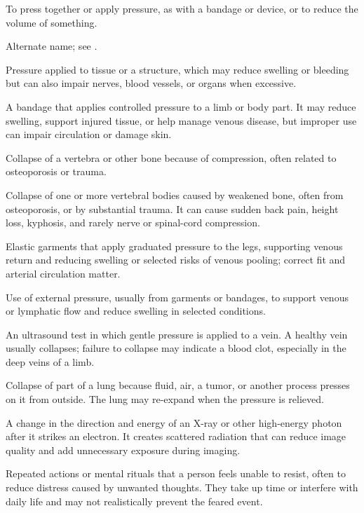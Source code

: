  To press together or apply pressure, as with a bandage or device, or to reduce the volume of something.

 Alternate name; see .

 Pressure applied to tissue or a structure, which may reduce swelling or bleeding but can also impair nerves, blood vessels, or organs when excessive.

 A bandage that applies controlled pressure to a limb or body part. It may reduce swelling, support injured tissue, or help manage venous disease, but improper use can impair circulation or damage skin.

 Collapse of a vertebra or other bone because of compression, often related to osteoporosis or trauma.

 Collapse of one or more vertebral bodies caused by weakened bone, often from osteoporosis, or by substantial trauma. It can cause sudden back pain, height loss, kyphosis, and rarely nerve or spinal-cord compression.

 Elastic garments that apply graduated pressure to the legs, supporting venous return and reducing swelling or selected risks of venous pooling; correct fit and arterial circulation matter.

 Use of external pressure, usually from garments or bandages, to support venous or lymphatic flow and reduce swelling in selected
conditions.

 An ultrasound test in which gentle pressure is applied to a vein. A healthy vein usually collapses; failure to collapse may indicate a blood clot, especially in the deep veins of a limb.

 Collapse of part of a lung because fluid, air, a tumor, or another process presses on it from outside. The lung may re-expand when the pressure is relieved.

 A change in the direction and energy of an X-ray or other high-energy photon after it strikes an electron. It creates scattered radiation that can reduce image quality and add unnecessary exposure during imaging.

 Repeated actions or mental rituals that a person feels unable to resist, often to reduce distress caused by unwanted thoughts. They take up time or interfere with daily life and may not realistically prevent the feared event.

